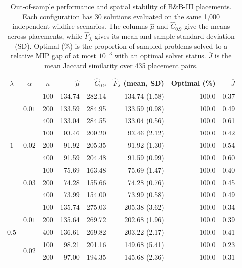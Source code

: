\documentclass[a4paper,fleqn]{cas-sc}
\begin{document}
\begin{table}[!htbp]
\centering
\caption{Out-of-sample performance and spatial stability of B\&B-III
placements. Each configuration has 30 solutions evaluated on the same
1,000 independent wildfire scenarios. The columns $\widehat\mu$ and
$\widehat C_{0.9}$ give the means across placements, while
$\widehat F_\lambda$ gives its mean and sample standard deviation (SD).
Optimal (\%) is the proportion of sampled problems solved to a relative
MIP gap of at most $10^{-3}$ with an optimal solver status.
$\overline J$ is the mean Jaccard similarity over 435 placement pairs.}
\label{tab:new20-oos-stability}
\setlength{\tabcolsep}{4pt}
\renewcommand{\arraystretch}{1.07}
\begin{tabular}{@{}ccc r r r r r@{}}
\toprule
$\lambda$ & $\alpha$ & $n$ & $\widehat\mu$ & $\widehat C_{0.9}$ & $\widehat F_\lambda$ (mean, SD) & Optimal (\%) & $\overline J$ \\
\midrule
\multirow{9}{*}{$1$} & \multirow{3}{*}{$0.01$} & 100 & 134.74 & 282.14 & 134.74 (1.58) & 100.0 & 0.37 \\
 &  & 200 & 133.59 & 284.95 & 133.59 (0.98) & 100.0 & 0.49 \\
 &  & 400 & 133.04 & 284.55 & 133.04 (0.56) & 100.0 & 0.61 \\
\cmidrule(l){2-8}
 & \multirow{3}{*}{$0.02$} & 100 & 93.46 & 209.20 & 93.46 (2.12) & 100.0 & 0.42 \\
 &  & 200 & 91.92 & 205.35 & 91.92 (1.30) & 100.0 & 0.54 \\
 &  & 400 & 91.59 & 204.48 & 91.59 (0.99) & 100.0 & 0.60 \\
\cmidrule(l){2-8}
 & \multirow{3}{*}{$0.03$} & 100 & 75.69 & 163.48 & 75.69 (1.47) & 100.0 & 0.40 \\
 &  & 200 & 74.28 & 155.66 & 74.28 (0.76) & 100.0 & 0.45 \\
 &  & 400 & 73.99 & 154.00 & 73.99 (0.58) & 100.0 & 0.49 \\
\midrule
\multirow{9}{*}{$0.5$} & \multirow{3}{*}{$0.01$} & 100 & 135.74 & 275.03 & 205.38 (3.62) & 100.0 & 0.34 \\
 &  & 200 & 135.64 & 269.72 & 202.68 (1.96) & 100.0 & 0.39 \\
 &  & 400 & 136.61 & 269.82 & 203.22 (2.17) & 100.0 & 0.41 \\
\cmidrule(l){2-8}
 & \multirow{3}{*}{$0.02$} & 100 & 98.21 & 201.16 & 149.68 (5.41) & 100.0 & 0.23 \\
 &  & 200 & 97.00 & 194.35 & 145.68 (2.36) & 100.0 & 0.31 \\

\end{tabular}
\end{table}
\end{document}
